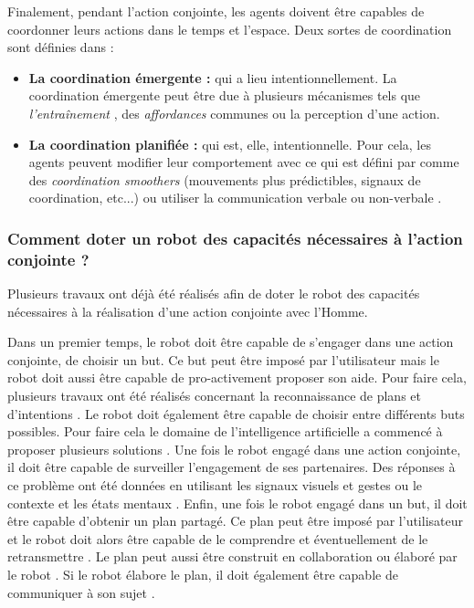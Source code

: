 \documentclass[english,a4paper,11pt,twoside]{StyleThese}
\begin{document}
Finalement, pendant l'action conjointe, les agents doivent être capables de coordonner leurs actions dans le temps et l'espace. Deux sortes de coordination sont définies dans \cite{knoblich20113} :
\begin{itemize}
\item \textbf{La coordination émergente :} qui a lieu intentionnellement. La coordination émergente peut être due à plusieurs mécanismes tels que \textit{l'entraînement} \cite{richardson2007rocking}, des \textit{affordances} communes \cite{gibson1977perceiving} ou la perception d'une action.
\item \textbf{La coordination planifiée :} qui est, elle, intentionnelle. Pour cela, les agents peuvent modifier leur comportement avec ce qui est défini par \cite{vesper2010minimal} comme des \textit{coordination smoothers} (mouvements plus prédictibles, signaux de coordination, etc...) ou utiliser la communication verbale ou non-verbale \cite{clark1996using}.
\end{itemize}


\subsubsection{Comment doter un robot des capacités nécessaires à l'action conjointe ?}

Plusieurs travaux ont déjà été réalisés afin de doter le robot des capacités nécessaires à la réalisation d'une action conjointe avec l'Homme. 

Dans un premier temps, le robot doit être capable de s'engager dans une action conjointe, de choisir un but. Ce but peut être imposé par l'utilisateur mais le robot doit aussi être capable de pro-activement proposer son aide. Pour faire cela, plusieurs travaux ont été réalisés concernant la reconnaissance de plans \cite{ramirez2009plan, bui2003general, singla2011abductive} et d'intentions \cite{breazeal2009embodied, baker2014modeling}. Le robot doit également être capable de choisir entre différents buts possibles. Pour faire cela le domaine de l'intelligence artificielle a commencé à proposer plusieurs solutions \cite{ghallab1994representation, lemai2004interleaving, roberts2016goal}. Une fois le robot engagé dans une action conjointe, il doit être capable de surveiller l'engagement de ses partenaires. Des réponses à ce problème ont été données en utilisant les signaux visuels et gestes \cite{sanghvi2011automatic} ou le contexte et les états mentaux \cite{salam2015multi}. Enfin, une fois le robot engagé dans un but, il doit être capable d'obtenir un plan partagé. Ce plan peut être imposé par l'utilisateur et le robot doit alors être capable de le comprendre \cite{pointeau2014successive, Mohseni2015} et éventuellement de le retransmettre \cite{petit2013coordinating, sorce2015proof}. Le plan peut aussi être construit en collaboration \cite{allen2002human} ou élaboré par le robot \cite{cirillo2010human,Lallement2014hatp}. Si le robot élabore le plan, il doit également être capable de communiquer à son sujet \cite{milliez2016using}.
\end{document}
